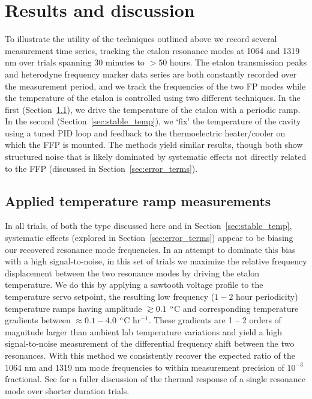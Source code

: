 \documentclass[10pt]{article}
\newcommand{\dC}{$^{\rm o}$C}
\begin{document}
\section{Results and discussion}
To illustrate the utility of the techniques outlined above we record several measurement time series, tracking the etalon resonance modes at 1064 and 1319 nm over trials spanning 30 minutes to $>50$ hours. The etalon transmission peaks and heterodyne frequency marker data series are both constantly recorded over the measurement period, and we track the frequencies of the two FP modes while the temperature of the etalon is controlled using two different techniques. In the first (Section~\ref{sec:driven_temp}), we drive the temperature of the etalon with a periodic ramp. In the second (Section~\ref{sec:stable_temp}), we \lq{}fix\rq{} the temperature of the cavity using a tuned PID loop and feedback to the thermoelectric heater/cooler on which the FFP is mounted. The methods yield similar results, though both show structured noise that is likely dominated by systematic effects not directly related to the FFP (discussed in Section~\ref{sec:error_terms}).

\subsection{Applied temperature ramp measurements}
\label{sec:driven_temp}
In all trials, of both the type discussed here and in Section~\ref{sec:stable_temp}, systematic effects (explored in Section~\ref{sec:error_terms}) appear to be biasing our recovered resonance mode frequencies. In an attempt to dominate this bias with a high signal-to-noise, in this set of trials we maximize the relative frequency displacement between the two resonance modes by driving the etalon temperature. We do this by applying a sawtooth voltage profile to the temperature servo setpoint, the resulting low frequency ($1 - 2$ hour periodicity) temperature ramps having amplitude $\gtrsim 0.1$ {\dC} and corresponding temperature gradients between $\approx 0.1 - 4.0$ {\dC} hr$^{-1}$.  These gradients are 1 -- 2 orders of magnitude larger than ambient lab temperature variations and yield a high signal-to-noise measurement of the differential frequency shift between the two resonances. With this method we consistently recover the expected ratio of the 1064 nm and 1319 nm mode frequencies to within measurement precision of $10^{-3}$ fractional. See \cite{Jennings:2016} for a fuller discussion of the thermal response of a single resonance mode over shorter duration trials.  
\end{document}
